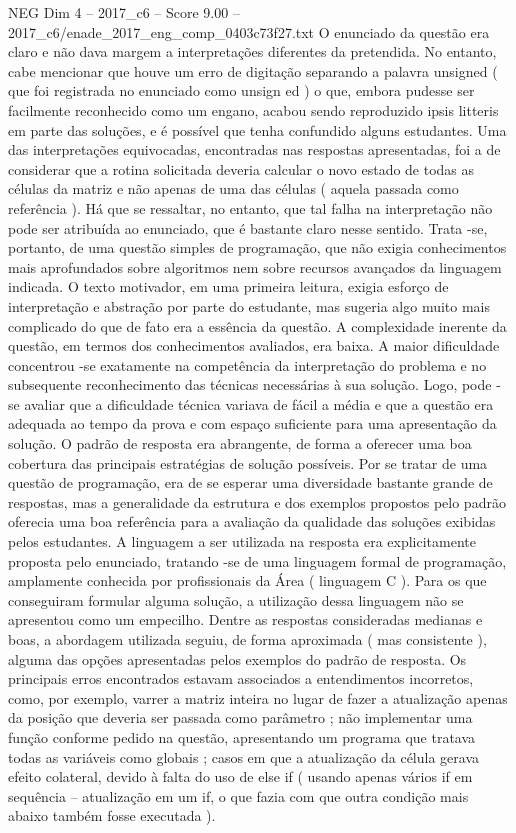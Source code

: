 \begin{textsample}{NEG Dim 4 – 2017\_c6 – Score 9.00 – 2017\_c6/enade\_2017\_eng\_comp\_0403c73f27.txt}
O enunciado da questão era claro e não dava margem a interpretações diferentes da pretendida.
No entanto, cabe mencionar que houve um erro de digitação separando a palavra unsigned ( que foi registrada no enunciado como unsign ed ) o que, embora pudesse ser facilmente reconhecido como um engano, acabou sendo reproduzido ipsis litteris em parte das soluções, e é possível que tenha confundido alguns estudantes.
Uma das interpretações equivocadas, encontradas nas respostas apresentadas, foi a de considerar que a rotina solicitada deveria calcular o novo estado de todas as células da matriz e não apenas de uma das células ( aquela passada como referência ).
Há que se ressaltar, no entanto, que tal falha na interpretação não pode ser atribuída ao enunciado, que é bastante claro nesse sentido.
Trata -se, portanto, de uma questão simples de programação, que não exigia conhecimentos mais aprofundados sobre algoritmos nem sobre recursos avançados da linguagem indicada.
O texto motivador, em uma primeira leitura, exigia esforço de interpretação e abstração por parte do estudante, mas sugeria algo muito mais complicado do que de fato era a essência da questão.
A complexidade inerente da questão, em termos dos conhecimentos avaliados, era baixa.
A maior dificuldade concentrou -se exatamente na competência da interpretação do problema e no subsequente reconhecimento das técnicas necessárias à sua solução.
Logo, pode -se avaliar que a dificuldade técnica variava de fácil a média e que a questão era adequada ao tempo da prova e com espaço suficiente para uma apresentação da solução.
O padrão de resposta era abrangente, de forma a oferecer uma boa cobertura das principais estratégias de solução possíveis.
Por se tratar de uma questão de programação, era de se esperar uma diversidade bastante grande de respostas, mas a generalidade da estrutura e dos exemplos propostos pelo padrão oferecia uma boa referência para a avaliação da qualidade das soluções exibidas pelos estudantes.
A linguagem a ser utilizada na resposta era explicitamente proposta pelo enunciado, tratando -se de uma linguagem formal de programação, amplamente conhecida por profissionais da Área ( linguagem C ).
Para os que conseguiram formular alguma solução, a utilização dessa linguagem não se apresentou como um empecilho.
Dentre as respostas consideradas medianas e boas, a abordagem utilizada seguiu, de forma aproximada ( mas consistente ), alguma das opções apresentadas pelos exemplos do padrão de resposta.
Os principais erros encontrados estavam associados a entendimentos incorretos, como, por exemplo, varrer a matriz inteira no lugar de fazer a atualização apenas da posição que deveria ser passada como parâmetro ; não implementar uma função conforme pedido na questão, apresentando um programa que tratava todas as variáveis como globais ; casos em que a atualização da célula gerava efeito colateral, devido à falta do uso de else if ( usando apenas vários if em sequência – atualização em um if, o que fazia com que outra condição mais abaixo também fosse executada ).

\end{textsample}
